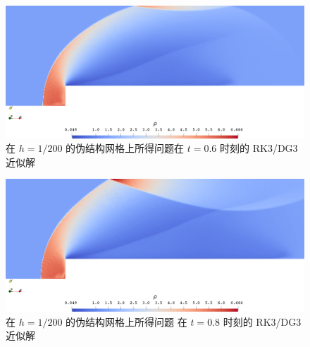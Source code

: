 \begin{figure}[h!]
\begin{centering}
\includegraphics[width=1\textwidth,height=0.28\textheight]{../mdpi/figures/forward_step/p=3_t=06e-1}
\par\end{centering}
\caption{\label{fig:forward_step_p=00003D3_t=00003D06e-1}在 $h=1/200$ 的伪结构网格上所得问题在
$t=0.6$ 时刻的 RK3/DG3 近似解}
\end{figure}

\begin{figure}[h!]
\begin{centering}
\includegraphics[width=1\textwidth,height=0.28\textheight]{../mdpi/figures/forward_step/p=3_t=08e-1}
\par\end{centering}
\caption{\label{fig:forward_step_p=00003D3_t=00003D08e-1}在 $h=1/200$ 的伪结构网格上所得问题
 在 $t=0.8$ 时刻的 RK3/DG3
近似解}
\end{figure}

